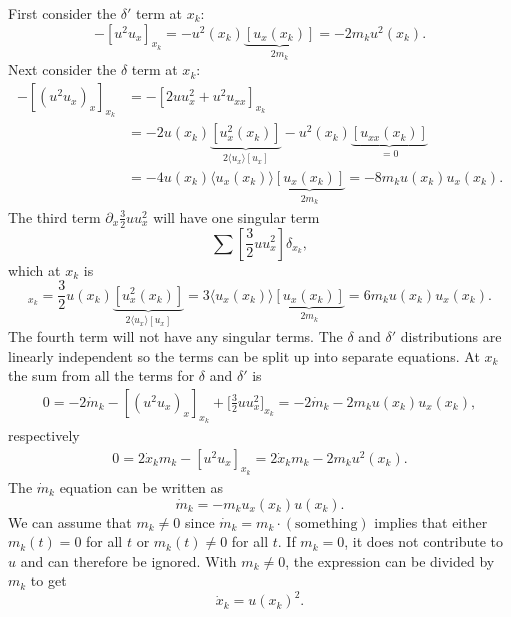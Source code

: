 \documentclass[english,master]{liumaiex}
\theoremstyle{thesisplain}
\theoremstyle{thesisdefinition}
\numberwithin{equation}{section}
\begin{document}
%
First consider the $\delta'$ term at $x_k$:
\begin{equation}
	- [u^2 u_x]_{x_k} = - u^2(x_k) \underbrace{[u_x(x_k)]}_{2m_k} = -2 m_k u^2(x_k).
\end{equation}
Next consider the $\delta$ term at $x_k$:
\begin{equation}
\begin{aligned}
	- [(u^2 u_x)_x]_{x_k} &= -[2u u_x^2 + u^2 u_{xx}]_{x_k} \\
		&= - 2u(x_k) \underbrace{[u_x^2(x_k)]}_{2\langle u_x \rangle [u_x]}
		- u^2(x_k) \underbrace{[u_{xx}(x_k)]}_{=0} \\
		&= -4u(x_k) \langle u_x(x_k) \rangle \underbrace{[u_x(x_k)]}_{2m_k} = -8m_k u(x_k) u_x(x_k).
\end{aligned}
\end{equation}
The third term $\partial_x \frac{3}{2}u u_x^2$ will have one singular term
\begin{equation}
	\sum [\frac{3}{2} u u_x^2] \delta_{x_k},
\end{equation}
which at $x_k$ is
\begin{equation}
	[\frac{3}{2}u u_x^2]_{x_k} = \frac{3}{2}u(x_k) \underbrace{[u_x^2(x_k)]}_{2\langle u_x \rangle [u_x]} = 3 \langle u_x(x_k) \rangle \underbrace{[u_x(x_k)]}_{2m_k} = 6m_k u(x_k) u_x(x_k).
\end{equation}
%
The fourth term will not have any singular terms. The $\delta$ and $\delta'$ distributions are linearly independent so the terms can be split up into separate equations. At $x_k$ the sum from all the terms for $\delta$ and $\delta'$ is
\begin{equation}
\begin{aligned}
	0 = -2 \dot{m}_k - [(u^2u_x)_x]_{x_k} + \Big[\frac{3}{2}uu_x^2 \Big]_{x_k} = -2 \dot{m}_k - 2 m_k u(x_k) u_x(x_k),
\end{aligned}
\end{equation}
respectively
\begin{equation}
\begin{aligned}
	0 = 2 \dot{x}_k m_k - [u^2u_x]_{x_k} = 2 \dot{x}_k m_k - 2m_ku^2(x_k).
\end{aligned}
\end{equation}
%
The $\dot{m}_k$ equation can be written as
\begin{equation}
	\dot{m}_k = -m_ku_x(x_k)u(x_k).
\end{equation}
We can assume that $m_k \neq 0$ since $\dot{m}_k = m_k \cdot (\text{something})$ implies that either $m_k(t) = 0$ for all $t$ or $m_k(t) \neq 0$ for all $t$. If $m_k = 0$, it does not contribute to $u$ and can therefore be ignored. With $m_k \neq 0$, the expression can be divided by $m_k$ to get
\begin{equation}
	\dot{x}_k = u(x_k)^2.
\end{equation}
\end{document}
